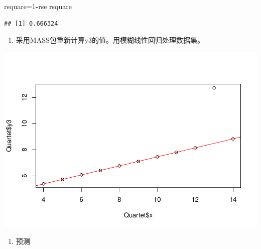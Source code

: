 \documentclass[
]{article}
\newenvironment{Shaded}{\begin{snugshade}}{\end{snugshade}}
\newcommand{\DataTypeTok}[1]{\textcolor[rgb]{0.13,0.29,0.53}{#1}}
\newcommand{\DecValTok}[1]{\textcolor[rgb]{0.00,0.00,0.81}{#1}}
\newcommand{\KeywordTok}[1]{\textcolor[rgb]{0.13,0.29,0.53}{\textbf{#1}}}
\newcommand{\NormalTok}[1]{#1}
\newcommand{\OperatorTok}[1]{\textcolor[rgb]{0.81,0.36,0.00}{\textbf{#1}}}
\newcommand{\StringTok}[1]{\textcolor[rgb]{0.31,0.60,0.02}{#1}}
\providecommand{\tightlist}{%
  \setlength{\itemsep}{0pt}\setlength{\parskip}{0pt}}
\begin{document}
\begin{Shaded}
\begin{Highlighting}[]
\NormalTok{rsquare=}\DecValTok{1}\OperatorTok{-}\NormalTok{rse}
\NormalTok{rsquare}
\end{Highlighting}
\end{Shaded}

\begin{verbatim}
## [1] 0.666324
\end{verbatim}

\begin{enumerate}
\def\labelenumi{\arabic{enumi}.}
\setcounter{enumi}{6}
\tightlist
\item
  采用MASS包重新计算y3的值。用模糊线性回归处理数据集。
\end{enumerate}

\begin{Shaded}
\end{Shaded}

\includegraphics{R_FinalReport_files/figure-latex/unnamed-chunk-36-1.pdf}

\begin{enumerate}
\def\labelenumi{\arabic{enumi}.}
\setcounter{enumi}{7}
\tightlist
\item
  预测
\end{enumerate}
\end{document}
